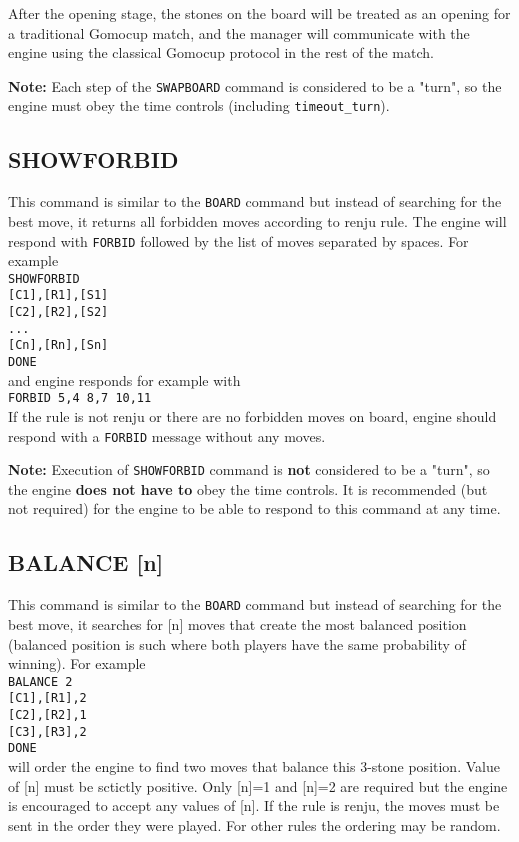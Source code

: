 \documentclass[12pt,a4paper]{article}
\begin{document}
After the opening stage, the stones on the board will be treated as an opening for a traditional Gomocup match, and the manager will communicate with the engine using the classical Gomocup protocol in the rest of the match.

\textbf{Note:} Each step of the \texttt{SWAPBOARD} command is considered to be a "turn", so the engine must obey the time controls (including \texttt{timeout{\_}turn}).


\subsection{SHOWFORBID}
\label{cmd_showforbid}
This command is similar to the \texttt{BOARD} command but instead of searching for the best move, it returns all forbidden moves according to renju rule. The engine will respond with \texttt{FORBID} followed by the list of moves separated by spaces. For example\\
\texttt{SHOWFORBID}\\
\texttt{[C1],[R1],[S1]} \\
\texttt{[C2],[R2],[S2]} \\
\texttt{...}\\
\texttt{[Cn],[Rn],[Sn]} \\
\texttt{DONE}\\
and engine responds for example with\\
\texttt{FORBID 5,4 8,7 10,11}\\
If the rule is not renju or there are no forbidden moves on board, engine should respond with a \texttt{FORBID} message without any moves.

\textbf{Note:} Execution of \texttt{SHOWFORBID} command is \textbf{not} considered to be a "turn", so the engine \textbf{does not have to} obey the time controls. It is recommended (but not required) for the engine to be able to respond to this command at any time.


\subsection{BALANCE [n]}
\label{cmd_balance}
This command is similar to the \texttt{BOARD} command but instead of searching for the best move, it searches for [n] moves that create the most balanced position (balanced position is such where both players have the same probability of winning). For example\\
\texttt{BALANCE 2} \\
\texttt{[C1],[R1],2} \\
\texttt{[C2],[R2],1} \\
\texttt{[C3],[R3],2} \\
\texttt{DONE}\\
will order the engine to find two moves that balance this 3-stone position. Value of [n] must be sctictly positive. Only [n]=1 and [n]=2 are required but the engine is encouraged to accept any values of [n]. If the rule is renju, the moves must be sent in the order they were played. For other rules the ordering may be random.
\end{document}
